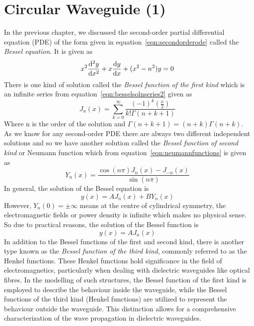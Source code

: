 \chapter{Circular Waveguide (1)}\label{lec:lec44}
In the previous chapter, we discussed the second-order partial differential equation (PDE) of the form given in equation~\eqref{eqn:secondorderode} called the \emph{Bessel equation}\label{bessel equation}. It is given as
\begin{equation*}
x^2\derivative[2]{y}{x} + x\derivative{y}{x} + (x^2-n^2)y = 0
\end{equation*}
There is one kind of solution called the \emph{Bessel function of the first kind} which is an infinite series from equation~\eqref{eqn:besselsolnseries2} given as
\begin{equation*}
J_n(x) = \sum^\infty_{k=0} \frac{(-1)^k (\frac{x}{2})}{k!\Gamma(n+k+1)}
\end{equation*}
Where n is the order of the solution and $\Gamma(n+k+1) = (n+k)\Gamma(n+k)$. As we know for any second-order PDE there are always two different independent solutions and so we have another solution called the \emph{Bessel function of second kind} or Neumann function which from equation~\eqref{eqn:neumannfunctions} is given as 
\[
Y_n(x) = \frac{\cos(n\pi)J_n(x)-J_{-n}(x)}{\sin(n\pi)}
\]
In general, the solution of the Bessel equation is
\[
y(x) = A J_n(x) + B Y_n(x)
\]
However, $Y_n(0)=\pm\infty$ means at the centre of cylindrical symmetry, the electromagnetic fields or power density is infinite which makes no physical sense. So due to practical reasons, the solution of the Bessel function is 
\[
y(x) = A J_n(x)
\]
In addition to the Bessel functions of the first and second kind, there is another type known as the \emph{Bessel function of the third kind}, commonly referred to as the Henkel functions. These Henkel functions hold significance in the field of electromagnetics, particularly when dealing with dielectric waveguides like optical fibres. In the modelling of such structures, the Bessel function of the first kind is employed to describe the behaviour inside the waveguide, while the Bessel functions of the third kind (Henkel functions) are utilized to represent the behaviour outside the waveguide. This distinction allows for a comprehensive characterization of the wave propagation in dielectric waveguides.
 
